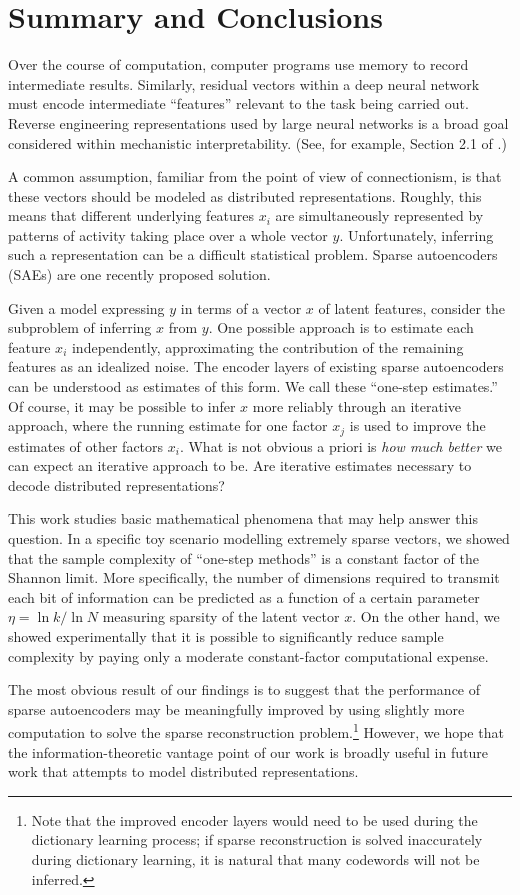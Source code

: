 \section{Summary and Conclusions}

Over the course of computation, computer programs use memory to record intermediate results. Similarly, residual vectors within a deep neural network must encode intermediate ``features'' relevant to the task being carried out. Reverse engineering representations used by large neural networks is a broad goal considered within mechanistic interpretability. (See, for example, Section 2.1 of \cite{sharkey_open_2025}.)

A common assumption, familiar from the point of view of connectionism, is that these vectors should be modeled as distributed representations. Roughly, this means that different underlying features $x_i$ are simultaneously represented by patterns of activity taking place over a whole vector $y$. Unfortunately, inferring such a representation can be a difficult statistical problem. Sparse autoencoders (SAEs) are one recently proposed solution.

Given a model expressing $y$ in terms of a vector $x$ of latent features, consider the subproblem of inferring $x$ from $y$. One possible approach is to estimate each feature $x_i$ independently, approximating the contribution of the remaining features as an idealized noise. The encoder layers of existing sparse autoencoders can be understood as estimates of this form. We call these ``one-step estimates.'' Of course, it may be possible to infer $x$ more reliably through an iterative approach, where the running estimate for one factor $x_j$ is used to improve the estimates of other factors $x_i$. What is not obvious a priori is \textit{how much better} we can expect an iterative approach to be. Are iterative estimates necessary to decode distributed representations?

This work studies basic mathematical phenomena that may help answer this question. In a specific toy scenario modelling extremely sparse vectors, we showed that the sample complexity of ``one-step methods'' is a constant factor of the Shannon limit. More specifically, the number of dimensions required to transmit each bit of information can be predicted as a function of a certain parameter $\eta = \ln k / \ln N$ measuring sparsity of the latent vector $x$. On the other hand, we showed experimentally that it is possible to significantly reduce sample complexity by paying only a moderate constant-factor computational expense.

The most obvious result of our findings is to suggest that the performance of sparse autoencoders may be meaningfully improved by using slightly more computation to solve the sparse reconstruction problem.\footnote{Note that the improved encoder layers would need to be used during the dictionary learning process; if sparse reconstruction is solved inaccurately during dictionary learning, it is natural that many codewords will not be inferred.} However, we hope that the information-theoretic vantage point of our work is broadly useful in future work that attempts to model distributed representations.
